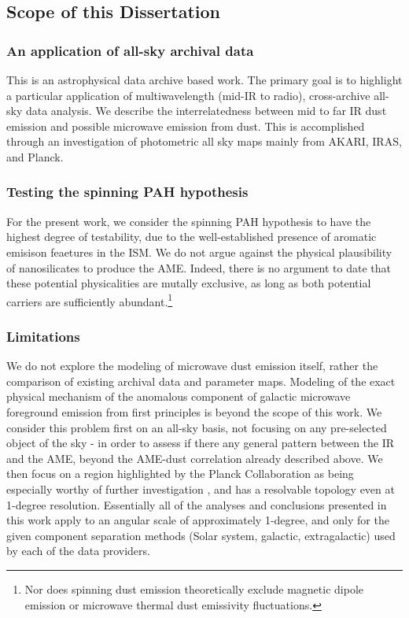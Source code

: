 \subsection{Scope of this Dissertation}

  \subsubsection{An application of all-sky archival data}
    This is an astrophysical data archive based work. The primary goal is to highlight a particular application of multiwavelength (mid-IR to radio), cross-archive all-sky data analysis. We describe the interrelatedness between mid to far IR dust emission and possible microwave emission from dust. This is accomplished through an investigation of photometric all sky maps mainly from AKARI, IRAS, and Planck.

  \subsubsection{Testing the spinning PAH hypothesis}
    For the present work, we consider the spinning PAH hypothesis to have the highest degree of testability, due to the well-established presence of aromatic emisison feaetures in the ISM.  We do not argue against the physical plausibility of nanosilicates to produce the AME. Indeed, there is no argument to date that these potential physicalities are mutally exclusive, as long as both potential carriers are sufficiently abundant.\footnote{Nor does spinning dust emission theoretically exclude magnetic dipole emission or microwave thermal dust emissivity fluctuations.}

  \subsubsection{Limitations}
    We do not explore the modeling of microwave dust emission itself, rather the comparison of existing archival data and parameter maps. Modeling of the exact physical mechanism of the anomalous component of galactic microwave foreground emission from first principles is beyond the scope of this work. We consider this problem first on an all-sky basis, not focusing on any pre-selected object of the sky - in order to assess if there any general pattern between the IR and the AME, beyond the AME-dust correlation already described above. We then focus on a region highlighted by the Planck Collaboration as being especially worthy of further investigation \citep{planck15X}, and has a resolvable topology even at 1-degree resolution. Essentially all of the analyses and conclusions presented in this work apply to an angular scale of approximately 1-degree, and only for the given component separation methods (Solar system, galactic, extragalactic) used by each of the data providers.

